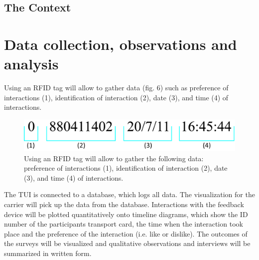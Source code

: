 \subsection{The Context}



\section{Data collection, observations and analysis}

Using an RFID tag will allow to gather data (fig. 6) such as preference of interactions (1), identification of interaction (2), date (3), and time (4) of interactions.

\begin{figure}[!h] 
\centering
\includegraphics[width=\textwidth]{Illustrations/numbers.jpg}
\caption [Data structure] {Using an RFID tag will allow to gather the following data: preference of interactions (1), identification of interaction (2), date (3), and time (4) of interactions.}
\label{Numbers}
\end{figure}

The TUI is connected to a database, which logs all data. 
The visualization for the carrier will pick up the data from the database. 
Interactions with the feedback device will be plotted quantitatively onto timeline diagrams, which show the ID number of the participants transport card, the time when the interaction took place and the preference of the interaction (i.e. like or dislike).
The outcomes of the surveys will be visualized and qualitative observations and interviews will be summarized in written form.

